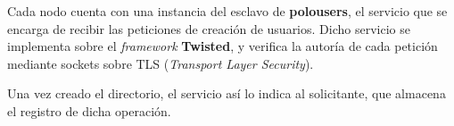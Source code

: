 \documentclass{article}
\begin{document}
Cada nodo cuenta con una instancia del esclavo de \textbf{polousers}, el servicio que se encarga de recibir las peticiones de creación de usuarios. Dicho servicio se implementa sobre el \textit{framework} \textbf{Twisted}, y verifica la autoría de cada petición mediante sockets sobre TLS (\textit{Transport Layer Security}).

Una vez creado el directorio, el servicio así lo indica al solicitante, que almacena el registro de dicha operación.

\label{Referencias}
\end{document}
